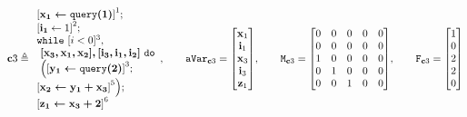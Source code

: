 \documentclass[a4paper,11pt]{article}
\begin{document}
\[
{{\ssa{c}3}  \triangleq
\begin{array}{l}
    \left[\ssa{ x_1 \leftarrow \query(1)}  \right]^1 ;
    \\
    \left[\ssa{i_1} \leftarrow 1 \right]^2 ; 
    \\
    \ewhile ~ [i < 0]^{3} ,
    \\
    ~\ssa{[ x_3,x_1 ,x_2 ], [i_3, i_1, i_2] }
    ~ \edo
    \\
    ~ \Big( 
    \left[\ssa{ y_1 \leftarrow \query(2)} \right]^3; \\
    \left[\ssa{x_2 \leftarrow y_1  + x_3 } \right]^5
    \Big) ; \\
    \left[ \ssa{\assign{z_1}{x_3 + 2}}  \right]^{6}
\end{array},
~~~~~~
\avar_{\ssa{c}3} = \left [ \begin{matrix}
\ssa{x}_1 \\
\ssa{i}_1 \\
\ssa{x}_3 \\
\ssa{i}_3 \\
\ssa{z}_1 \\
\end{matrix} \right ]
,~~~~~~
\Mtrix_{\ssa{c}3}  =  \left[ \begin{matrix}
 0 & 0 & 0 & 0 & 0 \\
 0 & 0 & 0 & 0 & 0 \\
 1 & 0 & 0 & 0 & 0 \\
 0 & 1 & 0 & 0 & 0 \\
 0 & 0 & 1 & 0 & 0 \\
\end{matrix} \right]
,~~~~~~
\flag_{\ssa{c}3} = \left [ \begin{matrix}
 1 \\
 0 \\
 2 \\
 2 \\
 0 \\
\end{matrix} \right ]
}
\]
\end{document}
